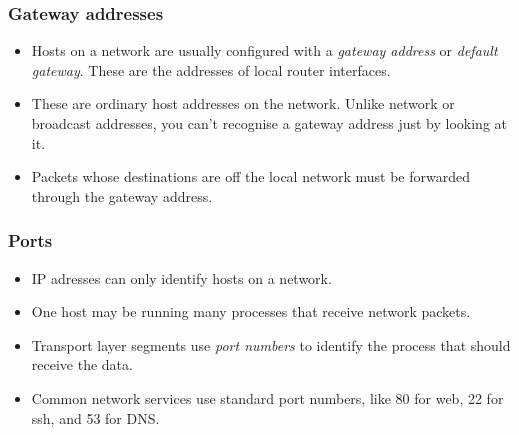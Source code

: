 \documentclass[10pt]{beamer}
\begin{document}
\begin{frame}
  \frametitle{Gateway addresses}

 \begin{itemize}
  \item Hosts on a network are usually configured with a \emph{gateway address} or \emph{default gateway}. These are the addresses of local router interfaces.
  \item These are ordinary host addresses on the network. Unlike network or broadcast addresses, you can't recognise a gateway address just by looking at it.
  \item Packets whose destinations are off the local network must be forwarded through the gateway address.
 \end{itemize}



\end{frame}

\begin{frame}
	\frametitle{Ports}
	
	\begin{itemize}
	    \item IP adresses can only identify hosts on a network.
	    \item One host may be running many processes that receive network packets.
		\item Transport layer segments use \emph{port numbers} to identify the process that should
		          receive the data.
		\item Common network services use standard port numbers, like 80 for web, 22 for ssh, and 53 for DNS.
	\end{itemize}
	
	
	
\end{frame}
\end{document}
